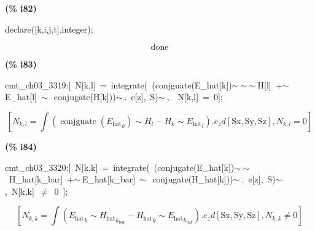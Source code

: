 \documentclass[fleqn]{article}
\begin{document}
\noindent
\begin{minipage}[t]{4.000000em}\color{red}\bfseries
(\% i82)	
\end{minipage}
\begin{minipage}[t]{\textwidth}\color{blue}
declare([k,i,j,t],integer);
\end{minipage}
\[\displaystyle \tag{\% o82} 
\ensuremath{\mathrm{done}}\mbox{}
\]


\noindent
\begin{minipage}[t]{4.000000em}\color{red}\bfseries
(\% i83)	
\end{minipage}
\begin{minipage}[t]{\textwidth}\color{blue}
cmt\_ch03\_3319:[\ N[k,l]\ =\ integrate(\ (conjguate(E\_hat[k])\ensuremath{\sim\ }\ensuremath{\sim\ }\ensuremath{\sim\ }H[l]\ +\ensuremath{\sim\ }E\_hat[l]\ \ensuremath{\sim\ }\ conjugate(H[k]))\ensuremath{\sim\ }.\ e[z],\ S)\ensuremath{\sim\ },\ \ N[k,l]\ =\ 0];
\end{minipage}
\[\displaystyle \tag{cmt\_ ch03\_ 3319} 
\left[ {N_{k,l}}=\int {\left. \left( \operatorname{conjguate}\left( {{{E_{\ensuremath{\mathrm{hat}}}}}_k}\right) \operatorname{\sim  }{H_l}-{H_k}\operatorname{\sim  }{{{E_{\ensuremath{\mathrm{hat}}}}}_l}\right) \ensuremath{\mathrm{ . }}{e_z}d\left[ \ensuremath{\mathrm{Sx}}\operatorname{,}\ensuremath{\mathrm{Sy}}\operatorname{,}\ensuremath{\mathrm{Sz}}\right] \right.}\operatorname{,}{N_{k,l}}=0\right] \mbox{}
\]


\noindent
\begin{minipage}[t]{4.000000em}\color{red}\bfseries
(\% i84)	
\end{minipage}
\begin{minipage}[t]{\textwidth}\color{blue}
cmt\_ch03\_3320:[\ N[k,k]\ =\ integrate(\ (conjugate(E\_hat[k])\ensuremath{\sim\ }\ensuremath{\sim\ }\ H\_hat[k\_bar]\ +\ensuremath{\sim\ }E\_hat[k\_bar]\ \ensuremath{\sim\ }\ conjugate(H\_hat[k]))\ensuremath{\sim\ }.\ e[z],\ S)\ensuremath{\sim\ },\ N[k,k]\ \ensuremath{\neq}\ 0\ ];
\end{minipage}
\[\displaystyle \tag{cmt\_ ch03\_ 3320} 
\left[ {N_{k,k}}=\int {\left. \left( {{{E_{\ensuremath{\mathrm{hat}}}}}_k}\operatorname{\sim  }{{{H_{\ensuremath{\mathrm{hat}}}}}_{{k_{\ensuremath{\mathrm{bar}}}}}}-{{{H_{\ensuremath{\mathrm{hat}}}}}_k}\operatorname{\sim  }{{{E_{\ensuremath{\mathrm{hat}}}}}_{{k_{\ensuremath{\mathrm{bar}}}}}}\right) \ensuremath{\mathrm{ . }}{e_z}d\left[ \ensuremath{\mathrm{Sx}}\operatorname{,}\ensuremath{\mathrm{Sy}}\operatorname{,}\ensuremath{\mathrm{Sz}}\right] \right.}\operatorname{,}{N_{k,k}}\operatorname{\neq }0\right] \mbox{}
\]
\end{document}
